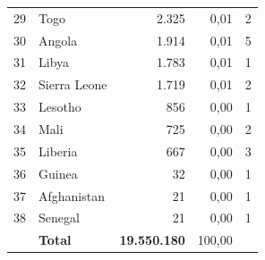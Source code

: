 \begin{longtable}{rlrrr}
29 & Togo & 2.325 & 0,01 & 2 \\
30 & Angola & 1.914 & 0,01 & 5 \\
31 & Libya & 1.783 & 0,01 & 1 \\
32 & Sierra Leone & 1.719 & 0,01 & 2 \\
33 & Lesotho & 856 & 0,00 & 1 \\
34 & Mali & 725 & 0,00 & 2 \\
35 & Liberia & 667 & 0,00 & 3 \\
36 & Guinea & 32 & 0,00 & 1 \\
37 & Afghanistan & 21 & 0,00 & 1 \\
38 & Senegal & 21 & 0,00 & 1 \\
\midrule & \textbf{Total} & \textbf{19.550.180} & 100,00 & \\ \bottomrule\end{longtable}

